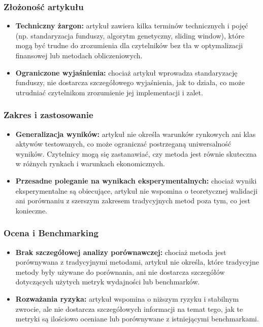 \documentclass[polish,envcountsect,10pt]{article}
\begin{document}
\subsubsection{Złożoność artykułu}

\begin{itemize}
	\item \textbf{Techniczny żargon:}
    artykuł zawiera kilka terminów technicznych i pojęć (np. standaryzacja funduszy, algorytm genetyczny, sliding window), które mogą być trudne do zrozumienia dla czytelników bez tła w optymalizacji finansowej lub metodach obliczeniowych.
	\item \textbf{Ograniczone wyjaśnienia:}
    chociaż artykuł wprowadza standaryzację funduszy, nie dostarcza szczegółowego wyjaśnienia, jak to działa, co może utrudniać czytelnikom zrozumienie jej implementacji i zalet.
\end{itemize}

\subsubsection{Zakres i zastosowanie}

\begin{itemize}
	\item \textbf{Generalizacja wyników:}
    artykuł nie określa warunków rynkowych ani klas aktywów testowanych, co może ograniczać postrzeganą uniwersalność wyników. Czytelnicy mogą się zastanawiać, czy metoda jest równie skuteczna w różnych rynkach i warunkach ekonomicznych.
	\item \textbf{Przesadne poleganie na wynikach eksperymentalnych:}
    chociaż wyniki eksperymentalne są obiecujące, artykuł nie wspomina o teoretycznej walidacji ani porównaniu z szerszym zakresem tradycyjnych metod poza tym, co jest konieczne.
\end{itemize}

\subsubsection{Ocena i Benchmarking}

\begin{itemize}
	\item \textbf{Brak szczegółowej analizy porównawczej:}
	chociaż metoda jest porównywana z tradycyjnymi metodami, artykuł nie określa, które tradycyjne metody były używane do porównania, ani nie dostarcza szczegółów dotyczących użytych metryk wydajności lub benchmarków.
	\item \textbf{Rozważania ryzyka:}
	artykuł wspomina o niższym ryzyku i stabilnym zwrocie, ale nie dostarcza szczegółowych informacji na temat tego, jak te metryki są ilościowo oceniane lub porównywane z istniejącymi benchmarkami.
\end{itemize}
\end{document}
